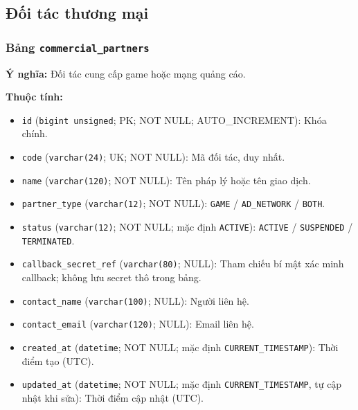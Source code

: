 \subsection{Đối tác thương mại}

\subsubsection{Bảng \texttt{commercial\_partners}}

\textbf{Ý nghĩa:} Đối tác cung cấp game hoặc mạng quảng cáo.\par

\textbf{Thuộc tính:}

\begin{itemize}

\item \texttt{id} (\texttt{bigint unsigned}; PK; NOT NULL; AUTO_INCREMENT): Khóa chính.

\item \texttt{code} (\texttt{varchar(24)}; UK; NOT NULL): Mã đối tác, duy nhất.

\item \texttt{name} (\texttt{varchar(120)}; NOT NULL): Tên pháp lý hoặc tên giao dịch.

\item \texttt{partner\_type} (\texttt{varchar(12)}; NOT NULL): \texttt{GAME} / \texttt{AD\_NETWORK} / \texttt{BOTH}.

\item \texttt{status} (\texttt{varchar(12)}; NOT NULL; mặc định \texttt{ACTIVE}): \texttt{ACTIVE} / \texttt{SUSPENDED} / \texttt{TERMINATED}.

\item \texttt{callback\_secret\_ref} (\texttt{varchar(80)}; NULL): Tham chiếu bí mật xác minh callback; không lưu secret thô trong bảng.

\item \texttt{contact\_name} (\texttt{varchar(100)}; NULL): Người liên hệ.

\item \texttt{contact\_email} (\texttt{varchar(120)}; NULL): Email liên hệ.

\item \texttt{created\_at} (\texttt{datetime}; NOT NULL; mặc định \texttt{CURRENT\_TIMESTAMP}): Thời điểm tạo (UTC).

\item \texttt{updated\_at} (\texttt{datetime}; NOT NULL; mặc định \texttt{CURRENT\_TIMESTAMP}, tự cập nhật khi sửa): Thời điểm cập nhật (UTC).

\end{itemize}

